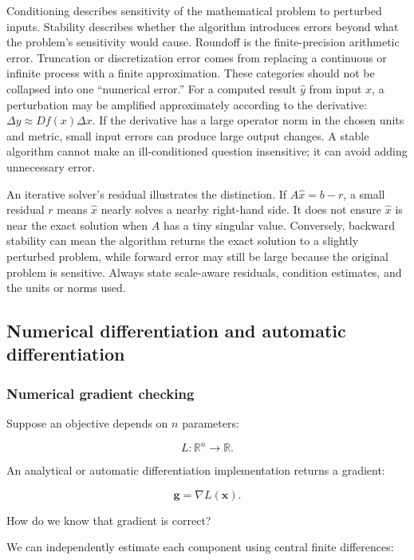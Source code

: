 Conditioning describes sensitivity of the mathematical problem to perturbed inputs. Stability describes whether the algorithm introduces errors beyond what the problem's sensitivity would cause. Roundoff is the finite-precision arithmetic error. Truncation or discretization error comes from replacing a continuous or infinite process with a finite approximation. These categories should not be collapsed into one ``numerical error.'' For a computed result \(\hat y\) from input \(x\), a perturbation may be amplified approximately according to the derivative: \(\Delta y\approx Df(x)\Delta x\). If the derivative has a large operator norm in the chosen units and metric, small input errors can produce large output changes. A stable algorithm cannot make an ill-conditioned question insensitive; it can avoid adding unnecessary error.

An iterative solver's residual illustrates the distinction. If \(A\hat x=b-r\), a small residual \(r\) means \(\hat x\) nearly solves a nearby right-hand side. It does not ensure \(\hat x\) is near the exact solution when \(A\) has a tiny singular value. Conversely, backward stability can mean the algorithm returns the exact solution to a slightly perturbed problem, while forward error may still be large because the original problem is sensitive. Always state scale-aware residuals, condition estimates, and the units or norms used.

\subsection{Numerical differentiation and automatic differentiation}\label{numerical-differentiation-and-automatic-differentiation}

\subsubsection{Numerical gradient checking}\label{numerical-gradient-checking}

Suppose an objective depends on \(n\) parameters:

\[
L:\mathbb R^n\rightarrow\mathbb R.
\]

An analytical or automatic differentiation implementation returns a gradient:

\[
\mathbf g= \nabla L(\mathbf x).
\]

How do we know that gradient is correct?

We can independently estimate each component using central finite differences:

